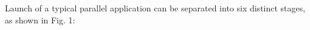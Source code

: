 Launch of a typical parallel application can be separated into six distinct stages, as shown in Fig. 1:
